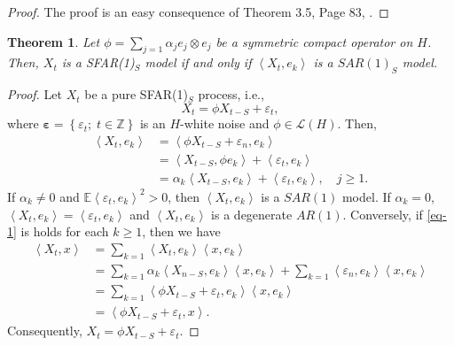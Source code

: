 \documentclass[11pt,a4paper]{article}
\newtheorem{Theorem} {Theorem}[section]
\numberwithin{equation}{section}
\newcommand{\E}{\mathbb{E}}
\begin{document}
\begin{proof}
  The proof is an easy consequence of Theorem 3.5, Page 83, \citet{Bosq2000}.
\end{proof}

\begin{Theorem}
  Let $\phi=\sum_{j=1}\alpha_j e_j\otimes e_j$ be a symmetric compact operator on $H$. Then, $X_t$ is a SFAR(1)$_S$ model if and only if $\left\langle X_t, e_k\right\rangle$ is a $SAR(1)_S$ model.
\end{Theorem}

\begin{proof}
  Let $X_t$ be a pure SFAR(1)$_S$ process, i.e.,
  $$
    X_{t}=\phi X_{t-S}+\varepsilon_{t},
  $$
  where $\bm{\varepsilon}=\left\{\varepsilon_{t};\;t\in\mathbb{Z}\right\}$ is an $H$-white noise and $\phi \in\mathcal{L}(H)$. Then,
  \begin{align}\label{eq-1}
    \left\langle X_t, e_k\right\rangle
      & = \left\langle \phi  X_{t-S}+\varepsilon_{n}, e_k\right\rangle\nonumber \\
      & = \left\langle X_{t-S}, \phi e_k\right\rangle+\left\langle \varepsilon_{t}, e_k\right\rangle\nonumber \\
      & = \alpha_k\left\langle X_{t-S}, e_k\right\rangle+\left\langle \varepsilon_{t}, e_k\right\rangle, \quad  j\geq 1.
  \end{align}
  If $\alpha_k\neq 0$ and $\E\left\langle \varepsilon_{t},e_k\right\rangle^2>0$, then $\left\langle X_t, e_k\right\rangle$ is a $SAR(1)$ model. If $\alpha_k= 0$, $\left\langle X_t, e_k\right\rangle=\left\langle \varepsilon_{t}, e_k\right\rangle$ and $\left\langle X_t, e_k\right\rangle$ is a degenerate $AR(1)$. Conversely, if \eqref{eq-1} is holds for each $k\geq 1$, then we have
  \begin{align*}
    \left\langle X_t,x\right\rangle
      & = \sum_{k=1}\left\langle X_t,e_k\right\rangle\left\langle x,e_k\right\rangle \\
      & = \sum_{k=1}\alpha_k\left\langle X_{n-S}, e_k\right\rangle\left\langle x,e_k\right\rangle+\sum_{k=1}\left\langle
     \varepsilon_{n}, e_k\right\rangle\left\langle x,e_k\right\rangle \\
      & = \sum_{k=1}\left\langle \phi X_{t-S}+\varepsilon_{t}, e_k\right\rangle\left\langle x,e_k\right\rangle \\
      & = \left\langle \phi X_{t-S}+\varepsilon_{t}, x\right\rangle.
  \end{align*}
  Consequently, $X_{t}=\phi X_{t-S}+\varepsilon_{t}$.
\end{proof}
\end{document}
